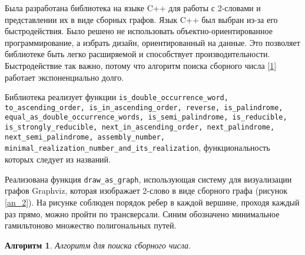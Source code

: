 \documentclass[a4paper,fleqn,12pt,top=0pt]{article}
\theoremstyle{plain}
\newtheorem{algorithm}[theorem]{Алгоритм}
\theoremstyle{definition}
\theoremstyle{remark}
\begin{document}
Была разработана библиотека\cite{github} на языке C++\cite{cpp} для работы с 2-словами и представлении их в виде сборных графов. Язык C++ был выбран из-за его быстродействия. Было решено не использовать объектно-ориентированное программирование, а избрать дизайн, ориентированный на данные\cite{data}. Это позволяет библиотеке быть легко расширяемой и способствует производительности. Быстродействие так важно, потому что алгоритм поиска сборного числа [\ref{algo}] работает экспоненциально долго. 

Библиотека реализует функции \texttt{is\_double\_occurrence\_word, \\ to\_ascending\_order, is\_in\_ascending\_order, reverse, is\_palindrome, equal\_as\_double\_occurrence\_words, is\_semi\_palindrome, is\_reducible, is\_strongly\_reducible, next\_in\_ascending\_order, next\_palindrome, next\_semi\_palindrome, assembly\_number, \\ minimal\_realization\_number\_and\_its\_realization}, функциональность которых следует из названий. 

Реализована функция \texttt{draw\_as\_graph}, использующая систему для визуализации графов Graphviz\cite{graphviz}, которая изображает 2-слово в виде сборного графа (рисунок \ref{an_2}). На рисунке соблюден порядок ребер в каждой вершине, проходя каждый раз прямо, можно пройти по трансверсали. Синим обозначено минимальное гамильтоново множество полигональных путей.

\begin{algorithm}\label{algo}
    Алгоритм для поиска сборного числа.
\end{algorithm}
\end{document}
